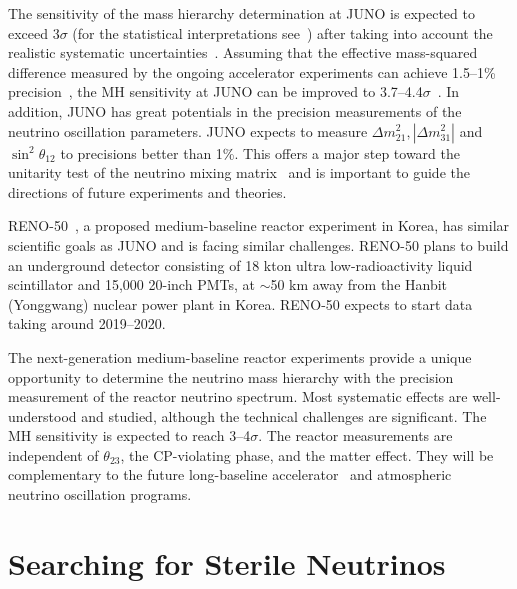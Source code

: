 \documentclass[aps,twocolumn,preprintnumbers,amsmath,superscriptaddress,amssymb,floats,nofootinbib]{revtex4-1}
\begin{document}
The sensitivity of the mass hierarchy determination at JUNO is expected to exceed 3$\sigma$ (for the statistical interpretations see~\cite{Qian-Stat,Blennow}) after taking into account the realistic systematic uncertainties~\cite{Li-PRD13,MBRwitepaper}. 
Assuming that the effective mass-squared difference measured by the ongoing accelerator experiments can achieve 1.5--1\% precision~\cite{Agarwalla}, the MH sensitivity at JUNO can be improved to 3.7--4.4$\sigma$~\cite{Li-PRD13}. 
In addition, JUNO has great potentials in the precision measurements of the neutrino oscillation parameters. JUNO expects to measure $\Delta m^2_{21}, |\Delta m^2_{31}|$ and $\sin^2 \theta_{12}$ to precisions better than 1\%. This offers a major step toward the unitarity test of the neutrino mixing matrix~\cite{unitarity13} and is important to guide the directions of future experiments and theories. 

RENO-50~\cite{RENO-50}, a proposed medium-baseline reactor experiment in Korea, has similar scientific goals as JUNO and is facing similar challenges. RENO-50 plans to build an underground detector consisting of 18 kton ultra low-radioactivity liquid scintillator and 15,000 20-inch PMTs, at $\sim$50 km away from the Hanbit (Yonggwang) nuclear power plant in Korea. RENO-50 expects to start data taking around 2019--2020.

The next-generation medium-baseline reactor experiments provide a unique opportunity to determine the neutrino mass hierarchy with the precision measurement of the reactor neutrino spectrum.
Most systematic effects are well-understood and studied, although the technical challenges are significant. 
The MH sensitivity is expected to reach 3--4$\sigma$.
The reactor measurements are independent of $\theta_{23}$, the CP-violating phase, and the matter effect. 
They will be complementary to the future long-baseline accelerator~\cite{LBNE} and atmospheric~\cite{PINGU} neutrino oscillation programs. 


\section{Searching for Sterile Neutrinos}
\end{document}
